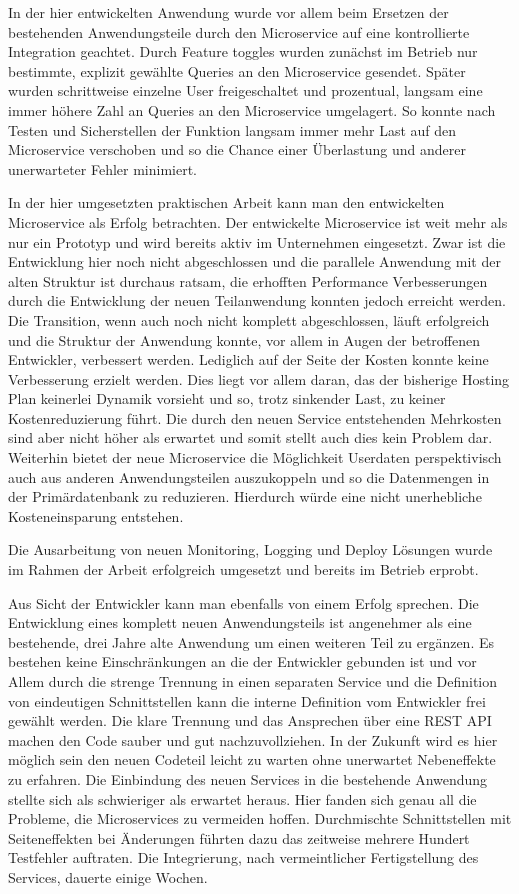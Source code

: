 In der hier entwickelten Anwendung wurde vor allem beim Ersetzen der bestehenden Anwendungsteile durch den Microservice auf eine kontrollierte Integration geachtet. Durch Feature toggles wurden zunächst im Betrieb nur bestimmte, explizit gewählte Queries an den Microservice gesendet. Später wurden schrittweise einzelne User freigeschaltet und prozentual, langsam eine immer höhere Zahl an Queries an den Microservice umgelagert. So konnte nach Testen und Sicherstellen der Funktion langsam immer mehr Last auf den Microservice verschoben und so die Chance einer Überlastung und anderer unerwarteter Fehler minimiert.

In der hier umgesetzten praktischen Arbeit kann man den entwickelten Microservice als Erfolg betrachten. Der entwickelte Microservice ist weit mehr als nur ein Prototyp und wird bereits aktiv im Unternehmen eingesetzt. Zwar ist die Entwicklung hier noch nicht abgeschlossen und die parallele Anwendung mit der alten Struktur ist durchaus ratsam, die erhofften Performance Verbesserungen durch die Entwicklung der neuen Teilanwendung konnten jedoch erreicht werden. Die Transition, wenn auch noch nicht komplett abgeschlossen, läuft erfolgreich und die Struktur der Anwendung konnte, vor allem in Augen der betroffenen Entwickler, verbessert werden. Lediglich auf der Seite der Kosten konnte keine Verbesserung erzielt werden. Dies liegt vor allem daran, das der bisherige Hosting Plan keinerlei Dynamik vorsieht und so, trotz sinkender Last, zu keiner Kostenreduzierung führt. Die durch den neuen Service entstehenden Mehrkosten sind aber nicht höher als erwartet und somit stellt auch dies kein Problem dar. Weiterhin bietet der neue Microservice die Möglichkeit Userdaten perspektivisch auch aus anderen Anwendungsteilen auszukoppeln und so die Datenmengen in der Primärdatenbank zu reduzieren. Hierdurch würde eine nicht unerhebliche Kosteneinsparung entstehen.

Die Ausarbeitung von neuen Monitoring, Logging und Deploy Lösungen wurde im Rahmen der Arbeit erfolgreich umgesetzt und bereits im Betrieb erprobt.

Aus Sicht der Entwickler kann man ebenfalls von einem Erfolg sprechen. Die Entwicklung eines komplett neuen Anwendungsteils ist  angenehmer als eine bestehende, drei Jahre alte Anwendung um einen weiteren Teil zu ergänzen. Es bestehen keine Einschränkungen an die der Entwickler gebunden ist und vor Allem durch die strenge Trennung in einen separaten Service und die Definition von eindeutigen Schnittstellen kann die interne Definition vom Entwickler frei gewählt werden. Die klare Trennung und das Ansprechen über eine REST API machen den Code sauber und gut nachzuvollziehen. In der Zukunft wird es hier möglich sein den neuen Codeteil leicht zu warten ohne unerwartet Nebeneffekte zu erfahren. Die Einbindung des neuen Services in die bestehende Anwendung stellte sich als schwieriger als erwartet heraus. Hier fanden sich genau all die Probleme, die Microservices zu vermeiden hoffen. Durchmischte Schnittstellen mit Seiteneffekten bei Änderungen führten dazu das zeitweise mehrere Hundert Testfehler auftraten. Die Integrierung, nach vermeintlicher Fertigstellung des Services, dauerte einige Wochen.

